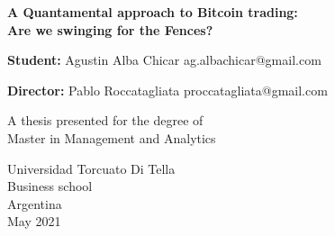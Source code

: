 \begin{titlepage}
   \begin{center}
        \vspace*{1cm}

        \huge
        \textbf{A Quantamental approach to Bitcoin trading:\\Are we swinging for the Fences?}

        \vspace{0.5cm}
        \large
            
        \vspace{2.5cm}
    \end{center}
    
    \textbf{Student:} Agustin Alba Chicar ag.albachicar@gmail.com

    \vspace{0.8cm}
    
    \textbf{Director:} Pablo Roccatagliata proccatagliata@gmail.com
    
    \vspace{5.0cm}
    
    \begin{center}
        A thesis presented for the degree of\\
        Master in Management and Analytics
            
        \vspace{0.8cm}
        
        \large
        Universidad Torcuato Di Tella\\
        Business school\\
        Argentina\\
        May 2021
    \end{center}
\end{titlepage}